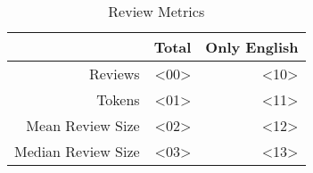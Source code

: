 \begin{table}[h]
    \centering
    \begin{tabular}{r|r|r}
    & Total & Only English\\\hline
        Reviews                 & <00> & <10>\\
        Tokens                  & <01> & <11>\\
        Mean Review Size        & <02> & <12>\\
        Median Review Size      & <03> & <13>
    \end{tabular}
    \caption{Review Metrics}
    \label{tab:review_metrics}
\end{table}